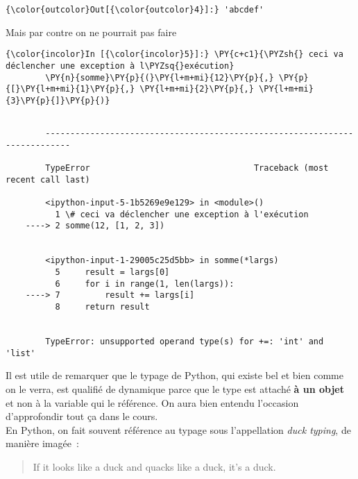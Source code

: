 \begin{Verbatim}[commandchars=\\\{\}]
{\color{outcolor}Out[{\color{outcolor}4}]:} 'abcdef'
\end{Verbatim}
            
    Mais par contre on ne pourrait pas faire

    \begin{Verbatim}[commandchars=\\\{\}]
{\color{incolor}In [{\color{incolor}5}]:} \PY{c+c1}{\PYZsh{} ceci va déclencher une exception à l\PYZsq{}exécution}
        \PY{n}{somme}\PY{p}{(}\PY{l+m+mi}{12}\PY{p}{,} \PY{p}{[}\PY{l+m+mi}{1}\PY{p}{,} \PY{l+m+mi}{2}\PY{p}{,} \PY{l+m+mi}{3}\PY{p}{]}\PY{p}{)}
\end{Verbatim}


    \begin{Verbatim}[commandchars=\\\{\}]

        ---------------------------------------------------------------------------

        TypeError                                 Traceback (most recent call last)

        <ipython-input-5-1b5269e9e129> in <module>()
          1 \# ceci va déclencher une exception à l'exécution
    ----> 2 somme(12, [1, 2, 3])
    

        <ipython-input-1-29005c25d5bb> in somme(*largs)
          5     result = largs[0]
          6     for i in range(1, len(largs)):
    ----> 7         result += largs[i]
          8     return result
    

        TypeError: unsupported operand type(s) for +=: 'int' and 'list'

    \end{Verbatim}

    Il est utile de remarquer que le typage de Python, qui existe bel et
bien comme on le verra, est qualifié de dynamique parce que le type est
attaché \textbf{à un objet} et non à la variable qui le référence. On
aura bien entendu l'occasion d'approfondir tout ça dans le cours.\\

    En Python, on fait souvent référence au typage sous l'appellation
\emph{duck typing}, de manière imagée~:

\begin{quote}
If it looks like a duck and quacks like a duck, it's a duck.
\end{quote}

